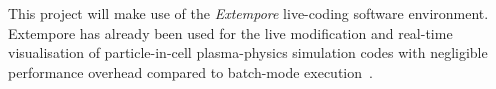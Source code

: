 This project will
make use of the \emph{Extempore} live-coding software
environment. Extempore has already
been used for the live modification and real-time visualisation of
particle-in-cell plasma-physics simulation codes with
negligible performance overhead compared to batch-mode execution~\parencite{swiftLive2016}. 





